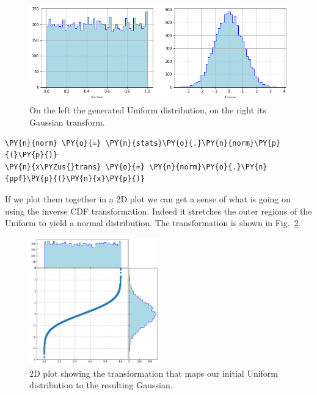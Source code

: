 \begin{figure}[h]
  \centering
  \includegraphics[width=1.\textwidth]{figures/uniform_gauss.png}
  \caption{On the left the generated Uniform distribution, on the right its Gaussian transform.}
  \label{fig:uniform_and_gauss}
\end{figure}

\begin{tcolorbox}[breakable, size=fbox, boxrule=1pt, pad at break*=1mm,colback=cellbackground, colframe=cellborder]
\begin{Verbatim}[commandchars=\\\{\}]
\PY{n}{norm} \PY{o}{=} \PY{n}{stats}\PY{o}{.}\PY{n}{norm}\PY{p}{(}\PY{p}{)} 
\PY{n}{x\PYZus{}trans} \PY{o}{=} \PY{n}{norm}\PY{o}{.}\PY{n}{ppf}\PY{p}{(}\PY{n}{x}\PY{p}{)}
\end{Verbatim}
\end{tcolorbox}

If we plot them together in a 2D plot we can get a sense of what is
going on using the inverse CDF transformation.
Indeed it stretches the outer regions of the Uniform to yield a
normal distribution. The transformation is shown in Fig.~\ref{fig:uniform_to_gauss}. 
    
\begin{figure}[htbp]
  \centering
  \includegraphics[width=0.5\textwidth]{figures/lesson6_7_0.png}
  \caption{2D plot showing the transformation that maps our initial Uniform distribution to the resulting Gaussian.}
  \label{fig:uniform_to_gauss}
\end{figure}
    
